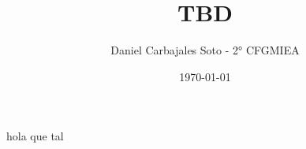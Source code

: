 \documentclass[spanish]{report}
\title{
\Huge{TBD}
}
\author{\large{Daniel Carbajales Soto - 2° CFGMIEA}}
\date{\today}
\begin{document}



hola que tal













\end{document}
